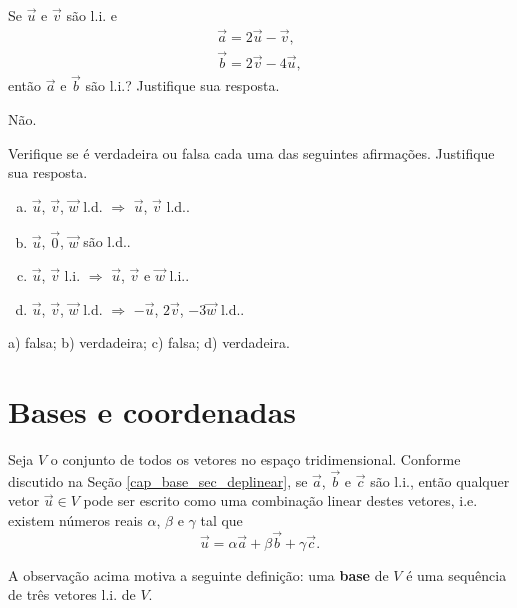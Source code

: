 \begin{exer}
  Se $\vec{u}$ e $\vec{v}$ são l.i. e
  \begin{align}
    \vec{a} = 2\vec{u} - \vec{v},\\
    \vec{b} = 2\vec{v} - 4\vec{u},
  \end{align}
  então $\vec{a}$ e $\vec{b}$ são l.i.? Justifique sua resposta.
\end{exer}
\begin{resp}
  Não.
\end{resp}

\begin{exer}
  Verifique se é verdadeira ou falsa cada uma das seguintes afirmações. Justifique sua resposta.
  \begin{enumerate}[a)]
  \item $\vec{u}$, $\vec{v}$, $\vec{w}$ l.d. $\Rightarrow$ $\vec{u}$, $\vec{v}$ l.d..
  \item $\vec{u}$, $\vec{0}$, $\vec{w}$ são l.d..
  \item $\vec{u}$, $\vec{v}$ l.i. $\Rightarrow$ $\vec{u}$, $\vec{v}$ e $\vec{w}$ l.i..
  \item $\vec{u}$, $\vec{v}$, $\vec{w}$ l.d. $\Rightarrow$ $-\vec{u}$, $2\vec{v}$, $-3\vec{w}$ l.d..
  \end{enumerate}
\end{exer}
\begin{resp}
  a) falsa; b) verdadeira; c) falsa; d) verdadeira.
\end{resp}

\section{Bases e coordenadas}\label{cap_base_sec_base}

Seja $V$ o conjunto de todos os vetores no espaço tridimensional. Conforme discutido na Seção \ref{cap_base_sec_deplinear}, se $\vec{a}$, $\vec{b}$ e $\vec{c}$ são l.i., então qualquer vetor $\vec{u}\in V$ pode ser escrito como uma combinação linear destes vetores, i.e. existem números reais $\alpha$, $\beta$ e $\gamma$ tal que
\begin{equation}
  \vec{u} = \alpha\vec{a} + \beta\vec{b} + \gamma\vec{c}.
\end{equation}

A observação acima motiva a seguinte definição: uma {\bf base} de $V$ é uma sequência de três vetores l.i. de $V$.

